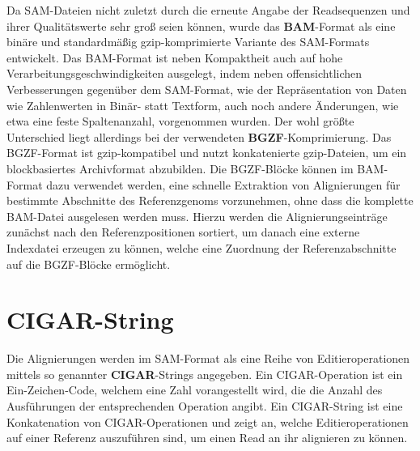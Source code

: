 Da SAM-Dateien nicht zuletzt durch die erneute Angabe der Readsequenzen und ihrer Qualitätswerte sehr groß seien können, wurde das \textbf{BAM}-Format als eine binäre und standardmäßig gzip-komprimierte Variante des SAM-Formats entwickelt.
Das BAM-Format ist neben Kompaktheit auch auf hohe Verarbeitungsgeschwindigkeiten ausgelegt, indem neben offensichtlichen Verbesserungen gegenüber dem SAM-Format, wie der Repräsentation von Daten wie Zahlenwerten in Binär- statt Textform, auch noch andere Änderungen, wie etwa eine feste Spaltenanzahl, vorgenommen wurden.
Der wohl größte Unterschied liegt allerdings bei der verwendeten \textbf{BGZF}-Komprimierung.
Das BGZF-Format ist gzip-kompatibel und nutzt konkatenierte gzip-Dateien, um ein blockbasiertes Archivformat abzubilden.
Die BGZF-Blöcke können im BAM-Format dazu verwendet werden, eine schnelle Extraktion von Alignierungen für bestimmte Abschnitte des Referenzgenoms vorzunehmen, ohne dass die komplette BAM-Datei ausgelesen werden muss.
Hierzu werden die Alignierungseinträge zunächst nach den Referenzpositionen sortiert, um danach eine externe Indexdatei erzeugen zu können, welche eine Zuordnung der Referenzabschnitte auf die BGZF-Blöcke ermöglicht.

\section{CIGAR-String}
\label{sec:data:cigar}
Die Alignierungen werden im SAM-Format als eine Reihe von Editieroperationen mittels so genannter \textbf{CIGAR}-Strings angegeben.
Ein CIGAR-Operation ist ein Ein-Zeichen-Code, welchem eine Zahl vorangestellt wird, die die Anzahl des Ausführungen der entsprechenden Operation angibt.
Ein CIGAR-String ist eine Konkatenation von CIGAR-Operationen und zeigt an, welche Editieroperationen auf einer Referenz auszuführen sind, um einen Read an ihr alignieren zu können.

